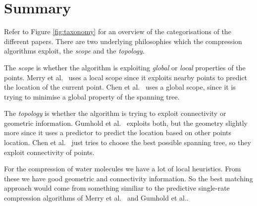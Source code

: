 \documentclass{report}
\begin{document}



\section{Summary}

Refer to Figure \ref{fig:taxonomy} for an overview of the categorisations of
the different papers. There are two underlying philosophies which the
compression algorithms exploit, the \emph{scope} and the \emph{topology}.

The \emph{scope} is whether the algorithm is exploiting \emph{global} or
\emph{local} properties of the points. Merry et al.~\cite{merrycomp} uses a
local scope since it exploits nearby points to predict the location of the
current point. Chen et al.~\cite{chen2005lcp} uses a global scope, since it is
trying to minimise a global property of the spanning tree.

The \emph{topology} is whether the algorithm is trying to exploit connectivity
or geometric information. Gumhold et al.~\cite{gumholdcomp} exploits both, but
the geometry slightly more since it uses a predictor to predict the location
based on other points location. Chen et al.~\cite{chen2005lcp} just tries to
choose the best possible spanning tree, so they exploit connectivity of
points.

For the compression of water molecules we have a lot of local heuristics. From
these we have good geometric and connectivity information. So the best
matching approach would come from something similiar to the predictive
single-rate compression algorithms of Merry et al.~\cite{merrycomp} and
Gumhold et al.\cite{gumholdcomp}.
\end{document}

